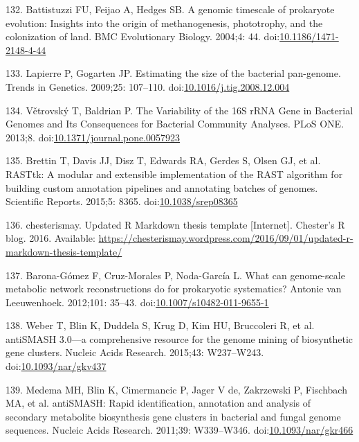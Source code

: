 \documentclass[12pt,twoside]{reedthesis}
\begin{document}
  \hypertarget{ref-battistuzziux5fgenomicux5f2004}{}
  132. Battistuzzi FU, Feijao A, Hedges SB. A genomic timescale of
  prokaryote evolution: Insights into the origin of methanogenesis,
  phototrophy, and the colonization of land. BMC Evolutionary Biology.
  2004;4: 44.
  doi:\href{https://doi.org/10.1186/1471-2148-4-44}{10.1186/1471-2148-4-44}
  
  \hypertarget{ref-lapierreux5festimatingux5f2009}{}
  133. Lapierre P, Gogarten JP. Estimating the size of the bacterial
  pan-genome. Trends in Genetics. 2009;25: 107--110.
  doi:\href{https://doi.org/10.1016/j.tig.2008.12.004}{10.1016/j.tig.2008.12.004}
  
  \hypertarget{ref-vetrovskyux5fvariabilityux5f2013}{}
  134. Větrovský T, Baldrian P. The Variability of the 16S rRNA Gene in
  Bacterial Genomes and Its Consequences for Bacterial Community Analyses.
  PLoS ONE. 2013;8.
  doi:\href{https://doi.org/10.1371/journal.pone.0057923}{10.1371/journal.pone.0057923}
  
  \hypertarget{ref-brettinux5frasttk:ux5f2015}{}
  135. Brettin T, Davis JJ, Disz T, Edwards RA, Gerdes S, Olsen GJ, et al.
  RASTtk: A modular and extensible implementation of the RAST algorithm
  for building custom annotation pipelines and annotating batches of
  genomes. Scientific Reports. 2015;5: 8365.
  doi:\href{https://doi.org/10.1038/srep08365}{10.1038/srep08365}
  
  \hypertarget{ref-chesterismayux5fupdatedux5f2016}{}
  136. chesterismay. Updated R Markdown thesis template {[}Internet{]}.
  Chester's R blog. 2016. Available:
  \url{https://chesterismay.wordpress.com/2016/09/01/updated-r-markdown-thesis-template/}
  
  \hypertarget{ref-barona-gomezux5fwhatux5f2012}{}
  137. Barona-Gómez F, Cruz-Morales P, Noda-García L. What can
  genome-scale metabolic network reconstructions do for prokaryotic
  systematics? Antonie van Leeuwenhoek. 2012;101: 35--43.
  doi:\href{https://doi.org/10.1007/s10482-011-9655-1}{10.1007/s10482-011-9655-1}
  
  \hypertarget{ref-weberux5fantismashux5f2015}{}
  138. Weber T, Blin K, Duddela S, Krug D, Kim HU, Bruccoleri R, et al.
  antiSMASH 3.0---a comprehensive resource for the genome mining of
  biosynthetic gene clusters. Nucleic Acids Research. 2015;43: W237--W243.
  doi:\href{https://doi.org/10.1093/nar/gkv437}{10.1093/nar/gkv437}
  
  \hypertarget{ref-medemaux5fantismash:ux5f2011}{}
  139. Medema MH, Blin K, Cimermancic P, Jager V de, Zakrzewski P,
  Fischbach MA, et al. antiSMASH: Rapid identification, annotation and
  analysis of secondary metabolite biosynthesis gene clusters in bacterial
  and fungal genome sequences. Nucleic Acids Research. 2011;39:
  W339--W346.
  doi:\href{https://doi.org/10.1093/nar/gkr466}{10.1093/nar/gkr466}
  
\end{document}
